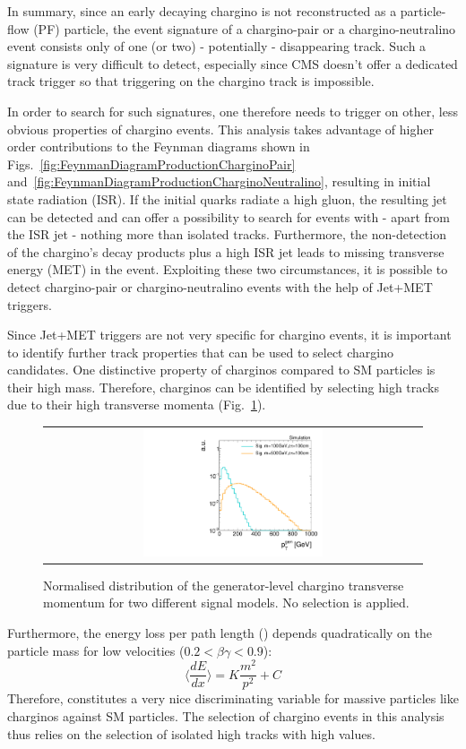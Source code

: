 In summary, since an early decaying chargino is not reconstructed as a particle-flow (PF) particle, the event signature of a chargino-pair or a chargino-neutralino event consists only of one (or two) - potentially - disappearing track. 
Such a signature is very difficult to detect, especially since CMS doesn't offer a dedicated track trigger so that triggering on the chargino track is impossible.


In order to search for such signatures, one therefore needs to trigger on other, less obvious properties of chargino events. 
This analysis takes advantage of higher order contributions to the Feynman diagrams shown in Figs.~\ref{fig:FeynmanDiagramProductionCharginoPair} and~\ref{fig:FeynmanDiagramProductionCharginoNeutralino}, resulting in initial state radiation (ISR).
If the initial quarks radiate a high \pt gluon, the resulting jet can be detected and can offer a possibility to search for events with - apart from the ISR jet - nothing more than isolated tracks.
Furthermore, the non-detection of the chargino's decay products plus a high \pt ISR jet leads to missing transverse energy (MET) in the event. 
Exploiting these two circumstances, it is possible to detect chargino-pair or chargino-neutralino events with the help of Jet+MET triggers.

Since Jet+MET triggers are not very specific for chargino events, it is important to identify further track properties that can be used to select chargino candidates.
One distinctive property of charginos compared to SM particles is their high mass. 
Therefore, charginos can be identified by selecting high \pt tracks due to their high transverse momenta (Fig.~\ref{fig:TrackPt_2Signal_noSelection_normalized}). 
\begin{figure}[!b]
  \centering 
  \begin{tabular}{c}
  \includegraphics[width=0.49\textwidth]{figures/analysis_2/MotivationAndGeneralSearchStrategy/hgenPtChiMiddleBinning_log.pdf}
  \end{tabular}
  \caption{Normalised distribution of the generator-level chargino transverse momentum for two different signal models. No selection is applied.} 
  \label{fig:TrackPt_2Signal_noSelection_normalized}
\end{figure}
Furthermore, the energy loss per path length (\dedx) depends quadratically on the particle mass for low velocities ($0.2<\beta\gamma<0.9$):
\begin{equation}
\langle\frac{dE}{dx}\rangle = K \frac{m^2}{p^2} +C
\end{equation}
Therefore, \dedx constitutes a very nice discriminating variable for massive particles like charginos against SM particles.
The selection of chargino events in this analysis thus relies on the selection of isolated high \pt tracks with high \dedx values. 

